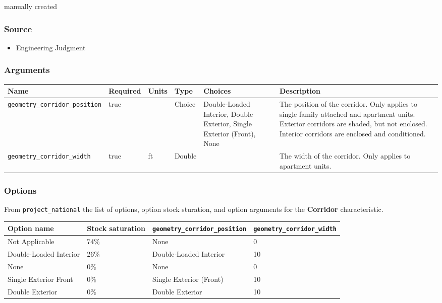 manually created

\subsubsection{Source}\label{source-26}

\begin{itemize}
 
\item
  Engineering Judgment
\end{itemize}

\subsubsection{Arguments}\label{arguments-16}

\begin{longtable}[]{@{}llllll@{}}
\toprule\noalign{}
Name & Required & Units & Type & Choices & Description \\
\midrule\noalign{}
\endhead
\bottomrule\noalign{}
\endlastfoot
\texttt{geometry\_corridor\_position} & true & & Choice & Double-Loaded
Interior, Double Exterior, Single Exterior (Front), None & The position
of the corridor. Only applies to single-family attached and apartment
units. Exterior corridors are shaded, but not enclosed. Interior
corridors are enclosed and conditioned. \\
\texttt{geometry\_corridor\_width} & true & ft & Double & & The width of
the corridor. Only applies to apartment units. \\
\end{longtable}

\subsubsection{Options}\label{options-26}

From \texttt{project\_national} the list of options, option stock
sturation, and option arguments for the \textbf{Corridor}
characteristic.

\begin{longtable}[]{@{}llll@{}}
\toprule\noalign{}
Option name & Stock saturation & \texttt{geometry\_corridor\_position} &
\texttt{geometry\_corridor\_width} \\
\midrule\noalign{}
\endhead
\bottomrule\noalign{}
\endlastfoot
Not Applicable & 74\% & None & 0 \\
Double-Loaded Interior & 26\% & Double-Loaded Interior & 10 \\
None & 0\% & None & 0 \\
Single Exterior Front & 0\% & Single Exterior (Front) & 10 \\
Double Exterior & 0\% & Double Exterior & 10 \\
\end{longtable}

